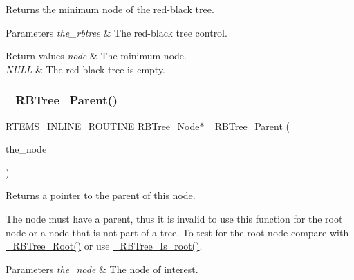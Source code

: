 Returns the minimum node of the red-\/black tree. 


\begin{DoxyParams}{Parameters}
{\em the\+\_\+rbtree} & The red-\/black tree control.\\
\hline
\end{DoxyParams}

\begin{DoxyRetVals}{Return values}
{\em node} & The minimum node. \\
\hline
{\em N\+U\+LL} & The red-\/black tree is empty. \\
\hline
\end{DoxyRetVals}
\mbox{\label{group__RTEMSScoreRBTree_ga15c887d3c6f0fe578b8ddb8332ad3828}} 
\subsubsection{\texorpdfstring{\_RBTree\_Parent()}{\_RBTree\_Parent()}}
{\footnotesize\ttfamily \mbox{\hyperlink{group__RTEMSScoreBaseDefs_gac216239df231d5dbd15e3520b0b9313f}{R\+T\+E\+M\+S\+\_\+\+I\+N\+L\+I\+N\+E\+\_\+\+R\+O\+U\+T\+I\+NE}} \mbox{\hyperlink{structRBTree__Node}{R\+B\+Tree\+\_\+\+Node}}$\ast$ \+\_\+\+R\+B\+Tree\+\_\+\+Parent (\begin{DoxyParamCaption}\item[{const \mbox{\hyperlink{structRBTree__Node}{R\+B\+Tree\+\_\+\+Node}} $\ast$}]{the\+\_\+node }\end{DoxyParamCaption})}



Returns a pointer to the parent of this node. 

The node must have a parent, thus it is invalid to use this function for the root node or a node that is not part of a tree. To test for the root node compare with \mbox{\hyperlink{group__RTEMSScoreRBTree_ga29242f056330aaabc12dcfcaa6f10a05}{\+\_\+\+R\+B\+Tree\+\_\+\+Root()}} or use \mbox{\hyperlink{group__RTEMSScoreRBTree_ga8496286f0a637353c8046e0d2625ea08}{\+\_\+\+R\+B\+Tree\+\_\+\+Is\+\_\+root()}}.


\begin{DoxyParams}{Parameters}
{\em the\+\_\+node} & The node of interest.\\
\hline
\end{DoxyParams}

